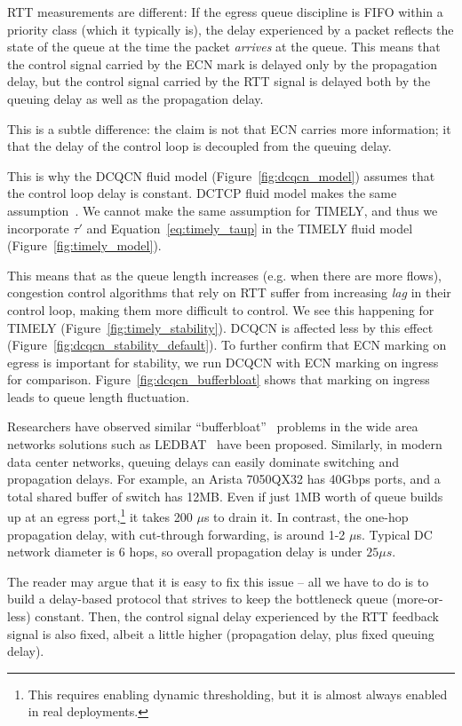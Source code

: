 RTT measurements are different: If the egress queue discipline is FIFO within a
priority class (which it typically is), the delay experienced by a packet
reflects the state of the queue at the time the packet {\em arrives} at the
queue. This means that the control signal carried by the ECN mark is delayed only by
the propagation delay, but the control signal carried by the RTT signal is
delayed both by the queuing delay as well as the propagation delay. 

This is a subtle difference: the claim is not that ECN carries more information;
it that the delay of the control loop is decoupled from the queuing delay.

This is why the DCQCN fluid model (Figure~\ref{fig:dcqcn_model}) assumes that
the control loop delay is constant. DCTCP fluid model makes the same assumption~\cite{dctcp-analysis}. 
We cannot make the same assumption for TIMELY, and  thus we incorporate $\tau'$ and
Equation~\ref{eq:timely_taup} in the TIMELY fluid model
(Figure~\ref{fig:timely_model}).

This means that as the queue length increases (e.g. when there are more flows),
congestion control algorithms that rely on RTT suffer from increasing {\em lag}
in their control loop, making them more difficult to control. We see this
happening for TIMELY (Figure~\ref{fig:timely_stability}). DCQCN is affected less
by this effect (Figure~\ref{fig:dcqcn_stability_default}). 
To further confirm that ECN marking on egress is important for stability,
we run DCQCN with ECN marking on ingress for comparison.
Figure~\ref{fig:dcqcn_bufferbloat} shows that marking on ingress leads to 
queue length fluctuation.

Researchers have observed similar ``bufferbloat''~\cite{bufferbloat} problems in
the wide area networks solutions such as LEDBAT~\cite{ledbat} have been
proposed. Similarly, in modern data center networks, queuing delays can easily
dominate switching and propagation delays.  For example, an Arista 7050QX32 has
40Gbps ports, and a total shared buffer of switch has 12MB.  Even if just 1MB
worth of queue builds up at an egress port,\footnote{This requires enabling
dynamic thresholding, but it is almost always enabled in real deployments.} it
takes 200 $\mu$s to drain it. In contrast, the one-hop propagation delay, with
cut-through forwarding, is around 1-2 $\mu$s.  Typical DC network diameter is 6
hops, so overall propagation delay is under $25\mu s$.

The reader may argue that it is easy to fix this issue  -- all we have to do is
to build a delay-based protocol that strives to keep the  bottleneck queue
(more-or-less) constant. Then, the control signal delay experienced by the RTT
feedback signal is also fixed, albeit a little higher (propagation delay, plus
fixed queuing delay). 

